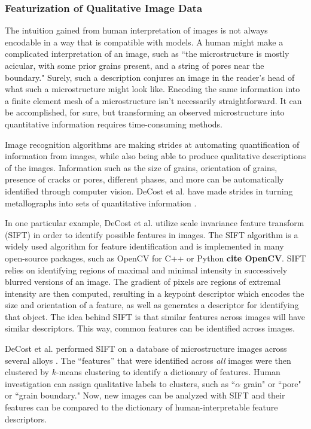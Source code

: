 \subsubsection{Featurization of Qualitative Image Data}
The intuition gained from human interpretation of images is not always encodable in a way that is compatible with models. A human might make a complicated interpretation of an image, such as ``the microstructure is mostly acicular, with some prior grains present, and a string of pores near the boundary." Surely, such a description conjures an image in the reader's head of what such a microstructure might look like. Encoding the same information into a finite element mesh of a microstructure isn't necessarily straightforward. It can be accomplished, for sure, but transforming an observed microstructure into quantitative information requires time-consuming methods. 

Image recognition algorithms are making strides at automating quantification of information from images, while also being able to produce qualitative descriptions of the images. Information such as the size of grains, orientation of grains, presence of cracks or pores, different phases, and more can be automatically identified through computer vision. DeCost et al. have made strides in turning metallographs into sets of quantitative information \cite{DeCost2015, DeCost2017, DeCost2017a}. 

In one particular example, DeCost et al. utilize scale invariance feature transform (SIFT) in order to identify possible features in images. The SIFT algorithm is a widely used algorithm for feature identification and is implemented in many open-source packages, such as OpenCV for C++ or Python \textbf{cite OpenCV}. SIFT relies on identifying regions of maximal and minimal intensity in successively blurred versions of an image. The gradient of pixels are regions of extremal intensity are then computed, resulting in a keypoint descriptor which encodes the size and orientation of a feature, as well as generates a descriptor for identifying that object. The idea behind SIFT is that similar features across images will have similar descriptors. This way, common features can be identified across images. 

DeCost et al. performed SIFT on a database of microstructure images across several alloys \cite{DeCost2015}. The ``features'' that were identified across \textit{all} images were then clustered by $k$-means clustering to identify a dictionary of features. Human investigation can assign qualitative labels to clusters, such as ``$\alpha$ grain" or ``pore" or ``grain boundary." Now, new images can be analyzed with SIFT and their features can be compared to the dictionary of human-interpretable feature descriptors. 

